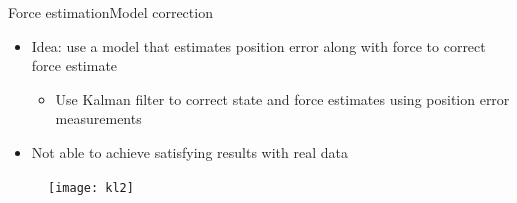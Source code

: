 

\begin{frame}{Force estimation}{Model correction}
\begin{itemize}
\item Idea: use a model that estimates position error along with force to correct force estimate
\begin{itemize}
\item Use Kalman filter to correct state and force estimates using position error measurements
\end{itemize}
\item Not able to achieve satisfying results with real data
\end{itemize}
\begin{figure}
\centering
\texttt{[image: kl2]}
\end{figure}
\end{frame}




